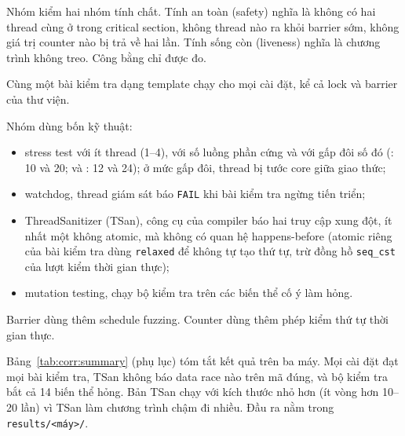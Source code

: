 
Nhóm kiểm hai nhóm tính chất. Tính an toàn (safety) nghĩa là không có hai thread
cùng ở trong critical section, không thread nào ra khỏi barrier sớm, không giá trị counter nào bị trả
về hai lần. Tính sống còn (liveness) nghĩa là chương trình không treo. Công bằng chỉ được đo.

Cùng một bài kiểm tra dạng template chạy cho mọi cài đặt, kể cả lock và barrier của thư viện.

Nhóm dùng bốn kỹ thuật:
\begin{itemize}[nosep]
  \item stress test với ít thread (1--4), với số luồng phần cứng và với gấp đôi số đó (:
    10 và 20;  và : 12 và 24); ở mức gấp đôi, thread bị tước core giữa giao thức;
  \item watchdog, thread giám sát báo \texttt{FAIL} khi bài kiểm tra ngừng tiến triển;
  \item ThreadSanitizer (TSan), công cụ của compiler báo hai truy cập xung đột, ít nhất một không atomic,
    mà không có quan hệ happens-before (atomic riêng của bài kiểm tra dùng \texttt{relaxed} để không tự tạo
    thứ tự, trừ đồng hồ \texttt{seq\_cst} của lượt kiểm thời gian thực);
  \item mutation testing, chạy bộ kiểm tra trên các biến thể cố ý làm hỏng.
\end{itemize}
Barrier dùng thêm schedule fuzzing. Counter dùng thêm phép kiểm thứ tự thời gian thực.

Bảng~\ref{tab:corr:summary} (phụ lục) tóm tắt kết quả trên ba máy. Mọi cài đặt đạt mọi bài kiểm tra, TSan
không báo data race nào trên mã đúng, và bộ kiểm tra bắt cả 14 biến thể hỏng. Bản TSan chạy với kích thước nhỏ hơn
(ít vòng hơn 10--20 lần) vì TSan làm chương trình chậm đi nhiều. Đầu ra nằm trong
\texttt{results/<máy>/}.

